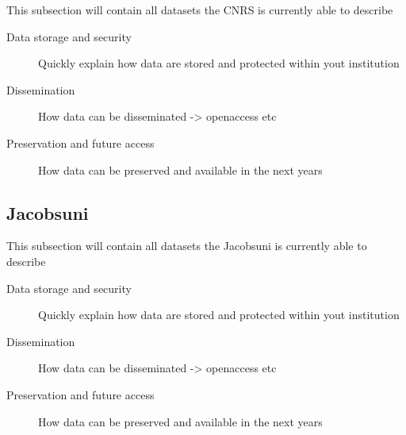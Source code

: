 \documentclass[12pt]{amsbook}
\begin{document}
This subsection will contain all datasets the CNRS is currently able to describe
\begin{description}
\item[Data storage and security] Quickly explain how data are stored and protected within yout institution
\item[Dissemination] How data can be disseminated -> openaccess etc
\item[Preservation and future access] How data can be preserved and available in the next years
\end{description}


\subsection{Jacobsuni}



This subsection will contain all datasets the Jacobsuni is currently able to describe
\begin{description}
\item[Data storage and security] Quickly explain how data are stored and protected within yout institution
\item[Dissemination] How data can be disseminated -> openaccess etc
\item[Preservation and future access] How data can be preserved and available in the next years
\end{description}
\end{document}
